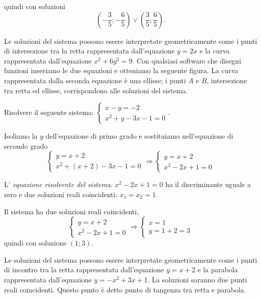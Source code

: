 \begin{exrig}
\begin{esempio}
\begin{itemize*}
quindi con soluzioni 
\[\left(-\frac 3 5;-\frac 6 5\right)\vee \left(\frac 3 5;\frac 6 5\right).\]
\end{itemize*}
\begin{multicols}{2}
Le soluzioni del sistema possono essere interpretate geometricamente come i punti di intersezione tra la retta rappresentata dall'equazione \(y=2x\) e la curva rappresentata dall'equazione \(x^2+6y^2=9\). Con qualsiasi software che disegni funzioni inseriamo le due equazioni e otteniamo la seguente figura.
La curva rappresentata dalla seconda equazione è una ellisse; i punti \( A \) e \( B \), intersezione tra retta ed ellisse, corrispondono alle soluzioni del sistema.
\begin{center}

\end{center}
 \end{multicols}
\end{esempio}

\begin{esempio}
Risolvere il seguente sistema: \(\left\{\begin{array}{l}x-y=-2 \\x^2+y-3x-1=0\end{array}\right..\)

Isoliamo la \(y\) dell'equazione di primo grado e sostituiamo nell'equazione di secondo grado 
\[\left\{\begin{array}{l}y=x+2 \\
x^2+\left(x+2\right)-3x-1=0\end{array}\right. 
\Rightarrow\left\{\begin{array}{l}y=x+2 \\
x^2-2x+1=0\end{array}\right.\]

L' \emph{equazione risolvente del sistema}. \(x^2-2x+1=0\) ha il discriminante uguale a zero e due soluzioni reali coincidenti: \(x_1=x_2=1\).

Il sistema ha due soluzioni reali coincidenti, 
\[\left\{\begin{array}{l}y=x+2 \\x^2-2x+1=0\end{array}\right. 
\Rightarrow\left\{\begin{array}{l}x=1 \\
y=1+2=3\end{array}\right.\] 
quindi con soluzione \((1;3)\).
\begin{multicols}{2}
Le soluzioni del sistema possono essere interpretate geometricamente come i punti di incontro tra la retta rappresentata dall'equazione \(y=x+2\) e la parabola rappresentata dall'equazione \(y=-x^2+3x+1\). La soluzioni saranno due punti reali coincidenti. Questo punto è detto punto di tangenza tra retta e parabola.
\begin{center}

\end{center}
 \end{multicols}
\end{esempio}


\end{exrig}
